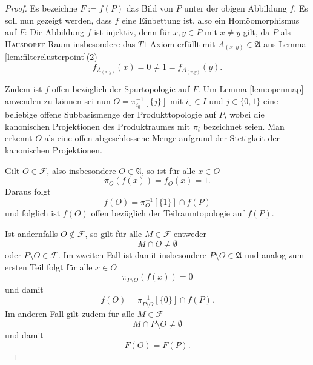 \begin{proof}
  Es bezeichne $F := f(P)$ das Bild von $P$ unter der obigen Abbildung $f$.
  Es soll nun gezeigt werden, dass $f$ eine Einbettung ist, also ein Homöomorphismus auf $F$:
  Die Abbildung $f$ ist injektiv, denn für $x,y \in P$ mit $x \neq y$ gilt, da $P$ als \textsc{Hausdorff}-Raum insbesondere das $T1$-Axiom erfüllt mit $A_{(x,y)} \in \mathfrak{A}$ aus Lemma \ref{lem:filterclusterpoint}(2) 
  \begin{displaymath}
    f_{A_{(x,y)}}(x) = 0 \neq 1 = f_{A_{(x,y)}}(y).
  \end{displaymath}

  Zudem ist $f$ offen bezüglich der Spurtopologie auf $F$.
  Um Lemma \ref{lem:openmap} anwenden zu können sei nun $O = \pi_{i_0}^{-1}[\{j\}]$ mit $i_0 \in I$ und $j \in \{0,1\}$ eine beliebige offene Subbasismenge der Produkttopologie auf $P$,  wobei die kanonischen Projektionen des Produktraumes mit $\pi_i$ bezeichnet seien.
  Man erkennt $O$ als eine offen-abgeschlossene Menge aufgrund der Stetigkeit der kanonischen Projektionen.

  Gilt $O \in \mathcal{F}$, also insbesondere $O \in \mathfrak{A}$, so ist für alle $x \in O$
  \begin{displaymath}
    \pi_O(f(x)) = f_O(x) = 1.
  \end{displaymath}
  Daraus folgt 
  \begin{displaymath}
    f(O) = \pi_O^{-1}[\{1\}] \cap f(P)
  \end{displaymath}
  und folglich ist $f(O)$ offen bezüglich der Teilraumtopologie auf $f(P)$.

  Ist andernfalls $O \not\in \mathcal{F}$, so gilt für alle $M \in \mathcal{F}$ entweder
  \begin{displaymath}
    M \cap O \neq \emptyset
  \end{displaymath}
  oder $P \setminus O \in \mathcal{F}$.
  Im zweiten Fall ist damit insbesondere $P \setminus O \in \mathfrak{A}$ und analog zum ersten Teil folgt für alle $x \in O$
  \begin{displaymath}
    \pi_{P \setminus O}(f(x)) = 0
  \end{displaymath}
  und damit 
  \begin{displaymath}
    f(O) = \pi_{P \setminus O}^{-1}[\{0\}] \cap f(P).
  \end{displaymath}
  Im anderen Fall gilt zudem für alle $M \in \mathcal{F}$
  \begin{displaymath}
    M \cap P \setminus O \neq \emptyset
  \end{displaymath}
  und damit 
  \begin{displaymath}
    F(O) = F(P).
  \end{displaymath}


\end{proof}
